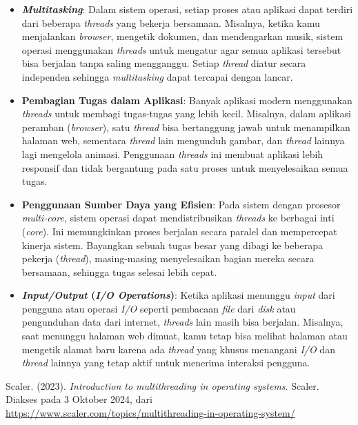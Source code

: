 \documentclass[12pt]{article}
\begin{document}
\begin{itemize}
    \item \textbf{\textit{Multitasking}}: Dalam sistem operasi, setiap proses atau aplikasi dapat terdiri dari beberapa \textit{threads} yang bekerja bersamaan. Misalnya, ketika kamu menjalankan \textit{browser}, mengetik dokumen, dan mendengarkan musik, sistem operasi menggunakan \textit{threads} untuk mengatur agar semua aplikasi tersebut bisa berjalan tanpa saling mengganggu. Setiap \textit{thread} diatur secara independen sehingga \textit{multitasking} dapat tercapai dengan lancar.
    
    \item \textbf{Pembagian Tugas dalam Aplikasi}: Banyak aplikasi modern menggunakan \textit{threads} untuk membagi tugas-tugas yang lebih kecil. Misalnya, dalam aplikasi peramban (\textit{browser}), satu \textit{thread} bisa bertanggung jawab untuk menampilkan halaman web, sementara \textit{thread} lain mengunduh gambar, dan \textit{thread} lainnya lagi mengelola animasi. Penggunaan \textit{threads} ini membuat aplikasi lebih responsif dan tidak bergantung pada satu proses untuk menyelesaikan semua tugas.
    
    \item \textbf{Penggunaan Sumber Daya yang Efisien}: Pada sistem dengan prosesor \textit{multi-core}, sistem operasi dapat mendistribusikan \textit{threads} ke berbagai inti (\textit{core}). Ini memungkinkan proses berjalan secara paralel dan mempercepat kinerja sistem. Bayangkan sebuah tugas besar yang dibagi ke beberapa pekerja (\textit{thread}), masing-masing menyelesaikan bagian mereka secara bersamaan, sehingga tugas selesai lebih cepat.
    
    \item \textbf{\textit{Input/Output} (\textit{I/O Operations})}: Ketika aplikasi menunggu \textit{input} dari pengguna atau operasi \textit{I/O} seperti pembacaan \textit{file} dari \textit{disk} atau pengunduhan data dari internet, \textit{threads} lain masih bisa berjalan. Misalnya, saat menunggu halaman web dimuat, kamu tetap bisa melihat halaman atau mengetik alamat baru karena ada \textit{thread} yang khusus menangani \textit{I/O} dan \textit{thread} lainnya yang tetap aktif untuk menerima interaksi pengguna.
\end{itemize}

\noindent Scaler. (2023). 
\textit{Introduction to multithreading in operating systems}. Scaler. Diakses pada 3 Oktober 2024, dari \\ 
\url{https://www.scaler.com/topics/multithreading-in-operating-system/}
\end{document}
